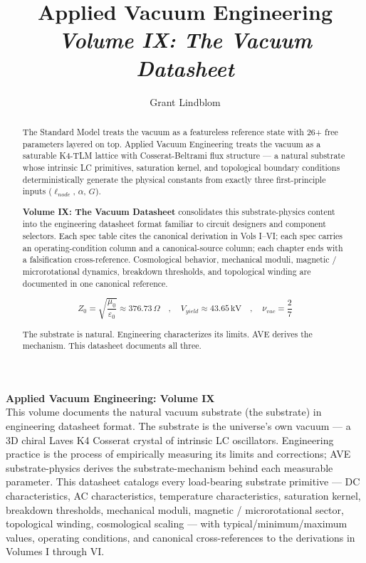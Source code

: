 \title{\textbf{Applied Vacuum Engineering} \\ \large \textit{Volume IX: The Vacuum Datasheet}}
\author{Grant Lindblom}
\date{}

\maketitle

\vfill
\noindent\textbf{Applied Vacuum Engineering: Volume IX} \\
This volume documents the natural vacuum substrate (the substrate) in engineering datasheet format. The substrate is the universe's own vacuum --- a 3D chiral Laves K4 Cosserat crystal of intrinsic LC oscillators. Engineering practice is the process of empirically measuring its limits and corrections; AVE substrate-physics derives the substrate-mechanism behind each measurable parameter. This datasheet catalogs every load-bearing substrate primitive --- DC characteristics, AC characteristics, temperature characteristics, saturation kernel, breakdown thresholds, mechanical moduli, magnetic / microrotational sector, topological winding, cosmological scaling --- with typical/minimum/maximum values, operating conditions, and canonical cross-references to the derivations in Volumes I through VI.

\begin{abstract}
    The Standard Model treats the vacuum as a featureless reference state with 26+ free parameters layered on top. Applied Vacuum Engineering treats the vacuum as a saturable K4-TLM lattice with Cosserat-Beltrami flux structure --- a natural substrate whose intrinsic LC primitives, saturation kernel, and topological boundary conditions deterministically generate the physical constants from exactly three first-principle inputs ($\ell_{node}$, $\alpha$, $G$).

    \textbf{Volume IX: The Vacuum Datasheet} consolidates this substrate-physics content into the engineering datasheet format familiar to circuit designers and component selectors. Each spec table cites the canonical derivation in Vols I--VI; each spec carries an operating-condition column and a canonical-source column; each chapter ends with a falsification cross-reference. Cosmological behavior, mechanical moduli, magnetic / microrotational dynamics, breakdown thresholds, and topological winding are documented in one canonical reference.

    \begin{equation}
        Z_0 = \sqrt{\frac{\mu_0}{\varepsilon_0}} \approx 376.73\,\Omega \quad , \quad V_{yield} \approx 43.65\,\text{kV} \quad , \quad \nu_{vac} = \frac{2}{7}
    \end{equation}

    The substrate is natural. Engineering characterizes its limits. AVE derives the mechanism. This datasheet documents all three.
\end{abstract}
